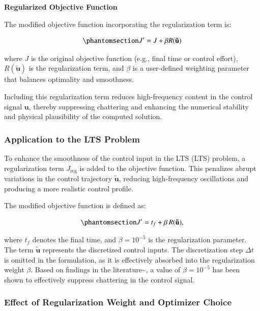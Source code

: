\documentclass[
  number,
  preprint]{elsarticle}
\begin{document}
\textbf{Regularized Objective Function}

The modified objective function incorporating the regularization term
is:

\begin{equation}\protect\phantomsection\label{eq-ch2-reg-objective}{
J' = J + \beta R(\mathbf{\tilde{u}})
}\end{equation}

where \(J\) is the original objective function (e.g., final time or
control effort), \(R(\mathbf{\tilde{u}})\) is the regularization term,
and \(\beta\) is a user-defined weighting parameter that balances
optimality and smoothness.

Including this regularization term reduces high-frequency content in the
control signal \(\mathbf{u}\), thereby suppressing chattering and
enhancing the numerical stability and physical plausibility of the
computed solution.

\subsubsection{Application to the LTS
Problem}\label{application-to-the-lts-problem}

To enhance the smoothness of the control input in the LTS (LTS) problem,
a regularization term \(J_{\text{reg}}\) is added to the objective
function. This penalizes abrupt variations in the control trajectory
\(\mathbf{\tilde{u}}\), reducing high-frequency oscillations and
producing a more realistic control profile.

The modified objective function is defined as:

\begin{equation}\protect\phantomsection\label{eq-ch2-regularized-obj}{
J' = t_f + \beta \, R(\mathbf{\tilde{u}}),
}\end{equation}

where \(t_f\) denotes the final time, and \(\beta = 10^{-5}\) is the
regularization parameter. The term \(\mathbf{\tilde{u}}\) represents the
discretized control inputs. The discretization step \(\Delta t\) is
omitted in the formulation, as it is effectively absorbed into the
regularization weight \(\beta\). Based on findings in the
literature\textasciitilde{}\citep{sanchez2016optimal}, a value of
\(\beta = 10^{-5}\) has been shown to effectively suppress chattering in
the control signal.

\subsubsection{Effect of Regularization Weight and Optimizer
Choice}\label{effect-of-regularization-weight-and-optimizer-choice}
\end{document}
